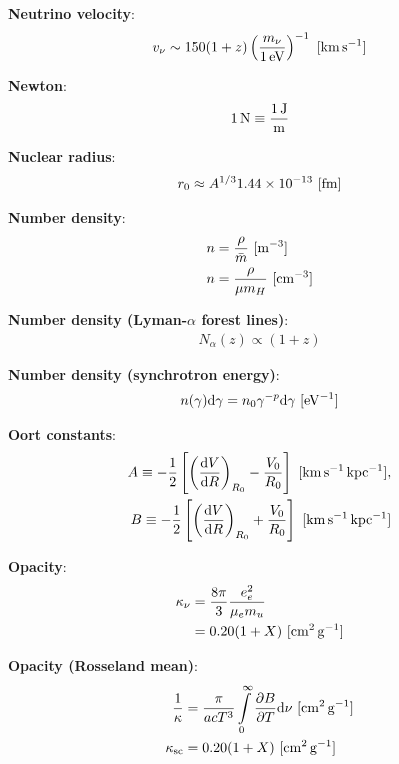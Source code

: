 \documentclass[a4paper,10pt]{article}
\begin{document}
{\noindent}\textbf{Neutrino velocity}:
\begin{align*}
    v_\nu \sim 150(1+z)\left(\frac{m_\nu}{1\,{\rm eV}}\right)^{-1} ~ [{\rm km\,s^{-1}}]
\end{align*}

{\noindent}\textbf{Newton}:
\begin{align*}
    {\rm 1\,N \equiv \frac{1\,J}{m}}
\end{align*}

{\noindent}\textbf{Nuclear radius}:
\begin{align*}
    r_0 \approx A^{1/3}1.44\times10^{-13} ~ [{\rm fm}]
\end{align*}

{\noindent}\textbf{Number density}:
\begin{align*}
    n &= \frac{\rho}{\bar{m}} ~ [{\rm m^{-3}}] \\
    n &= \frac{\rho}{\mu m_H} ~ [{\rm cm^{-3}}]
\end{align*}

{\noindent}\textbf{Number density (Lyman-$\alpha$ forest lines)}:
\begin{align*}
    N_\alpha(z) \propto (1+z)
\end{align*}

{\noindent}\textbf{Number density (synchrotron energy)}:
\begin{align*}
    n(\gamma){\rm d}\gamma = n_0\gamma^{-p}{\rm d}\gamma ~ [{\rm eV^{-1}}]
\end{align*}

{\noindent}\textbf{Oort constants}:
\begin{align*}
    A \equiv -\frac{1}{2} \left[\left(\frac{{\rm d}V}{{\rm d}R}\right)_{R_0} -\frac{V_0}{R_0}\right] ~ [{\rm km\,s^{-1}\,kpc^{-1}}],\\
    B \equiv -\frac{1}{2} \left[\left(\frac{{\rm d}V}{{\rm d}R}\right)_{R_0} +\frac{V_0}{R_0}\right] ~ [{\rm km\,s^{-1}\,kpc^{-1}}]
\end{align*}

{\noindent}\textbf{Opacity}:
\begin{align*}
    \kappa_\nu &= \frac{8\pi}{3} \frac{e_e^2}{\mu_em_u} \\
    &= 0.20(1+X) ~ [{\rm cm^2\,g^{-1}}]
\end{align*}

{\noindent}\textbf{Opacity (Rosseland mean)}:
\begin{align*} 
    \frac{1}{\kappa} &= \frac{\pi}{acT^3} \int\limits_0^\infty \frac{\partial B}{\partial T} {\rm d}\nu  ~ [{\rm cm^2\,g^{-1}}] \\
    \kappa_{\rm sc} &= 0.20(1+X) ~ [{\rm cm^2\,g^{-1}}]
\end{align*}
\end{document}
